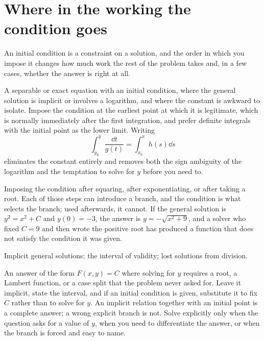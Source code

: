 \section{Where in the working the condition goes}

An initial condition is a constraint on a solution, and the order in which you impose it changes how much work the rest of the problem takes and, in a few cases, whether the answer is right at all.

\cue A separable or exact equation with an initial condition, where the general solution is implicit or involves a logarithm, and where the constant is awkward to isolate.
\method Impose the condition at the earliest point at which it is legitimate, which is normally immediately after the first integration, and prefer definite integrals with the initial point as the lower limit. Writing
\[
\int_{y_0}^{y}\frac{\dd t}{g(t)}=\int_{x_0}^{x}h(s)\dd s
\]
eliminates the constant entirely and removes both the sign ambiguity of the logarithm and the temptation to solve for $y$ before you need to.
\begin{trap}
Imposing the condition after squaring, after exponentiating, or after taking a root. Each of those steps can introduce a branch, and the condition is what selects the branch; used afterwards, it cannot. If the general solution is $y^{2}=x^{2}+C$ and $y(0)=-3$, the answer is $y=-\sqrt{x^{2}+9}$, and a solver who fixed $C=9$ and then wrote the positive root has produced a function that does not satisfy the condition it was given.
\end{trap}

\begin{seealsob}Implicit general solutions; the interval of validity; lost solutions from division.\end{seealsob}

\cue An answer of the form $F(x,y)=C$ where solving for $y$ requires a root, a Lambert function, or a case split that the problem never asked for.
\method Leave it implicit, state the interval, and if an initial condition is given, substitute it to fix $C$ rather than to solve for $y$. An implicit relation together with an initial point is a complete answer; a wrong explicit branch is not. Solve explicitly only when the question asks for a value of $y$, when you need to differentiate the answer, or when the branch is forced and easy to name.

